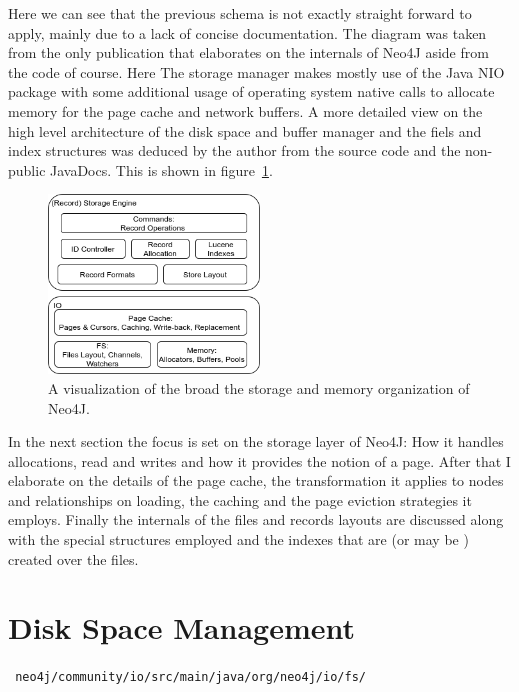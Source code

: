 \documentclass[a4paper,10pt]{article}
\begin{document}
Here we can see that the previous schema is not exactly straight forward to apply, mainly due to a lack of concise documentation. The diagram was taken from the only publication that elaborates on the internals of Neo4J aside from the code of course. Here The storage manager makes mostly use of the Java NIO package with some additional usage of operating system native calls to allocate memory for the page cache and network buffers. 
A more detailed view on the high level architecture of the disk space and buffer manager and the fiels and index structures was deduced by the author from the source code and the non-public JavaDocs. This is shown in figure~\ref{N4J_Storage}.

\begin{figure}[htp]\label{N4J_Storage}
 \begin{center}
  \includegraphics[keepaspectratio,width=0.5\textwidth]{img/N4J_Storage.png}
 \end{center}
 \caption{A visualization of the broad the storage and memory organization of Neo4J.} %
\end{figure}

In the next section the focus is set on the storage layer of Neo4J: How it handles allocations, read and writes and how it provides the notion of a page. After that I elaborate on the details of the page cache, the transformation it applies to nodes and relationships on loading, the caching and the page eviction strategies it employs. Finally the internals of the files and records layouts are discussed along with the special structures employed and the indexes that are (or may be ) created over the files.

\section{Disk Space Management}
\texttt{
neo4j/community/io/src/main/java/org/neo4j/io/fs/
} \\
\end{document}
